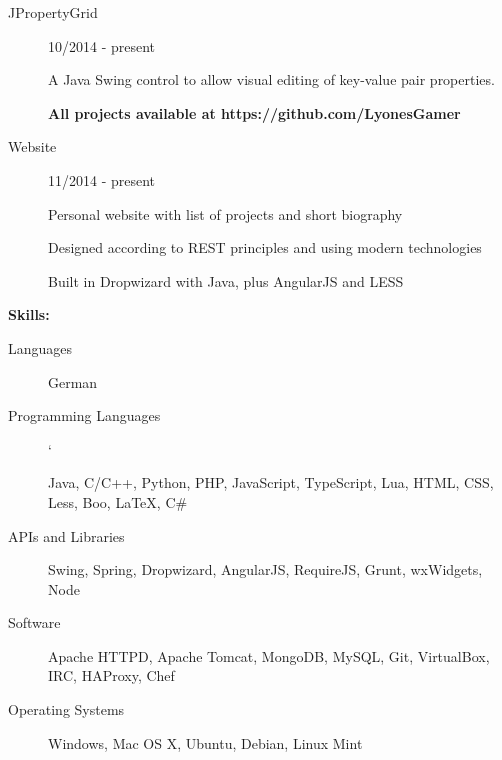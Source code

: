 \documentclass[11pt]{article}
\begin{document}
\begin{description}
\item[JPropertyGrid]
\hfill 10/2014 - present

A Java Swing control to allow visual editing of key-value pair properties.

\textbf{All projects available at https://github.com/LyonesGamer}


\item[Website]
\hfill 11/2014 - present

Personal website with list of projects and short biography

Designed according to REST principles and using modern technologies

Built in Dropwizard with Java, plus AngularJS and LESS
\hfill
\end{description}
\bigskip
{\Large \textbf{Skills:}}
\hrulefill
\bigskip
\begin{description}
\item[Languages]
\hfill

German

\item[Programming Languages]
\hfill`

Java, C/C++, Python, PHP, JavaScript, TypeScript, Lua, HTML, CSS, Less,  Boo, LaTeX, C\#

\item[APIs and Libraries]
\hfill

Swing, Spring, Dropwizard, AngularJS, RequireJS, Grunt, wxWidgets, Node

\item[Software]
\hfill

Apache HTTPD, Apache Tomcat, MongoDB, MySQL, Git, VirtualBox, IRC, HAProxy, Chef

\item[Operating Systems]
\hfill

Windows, Mac OS X, Ubuntu, Debian, Linux Mint
\end{description}
\end{document}
